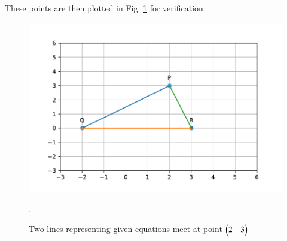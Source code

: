 \begin{enumerate}
\end{enumerate}
These points are then plotted in Fig. \ref{linform/2006/2/11/Fig 1.1} for verification.
\begin{figure}[h]
\centering
\includegraphics[width=\columnwidth]{linear_forms/solutions/2006/2/11/Figures/line.pdf}
\caption{Two lines representing given equations meet at point $\begin{pmatrix}2 & 3\end{pmatrix}$ }.
\label{linform/2006/2/11/Fig 1.1}
\end{figure}
